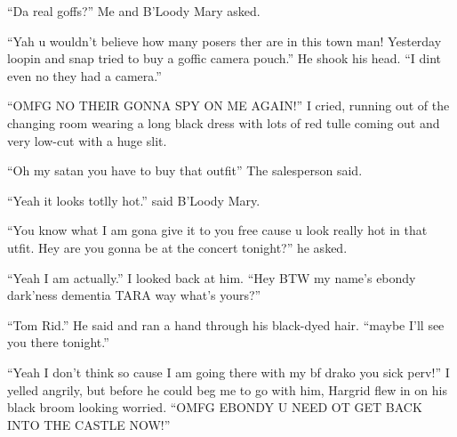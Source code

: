 \enquote{Da real goffs?} Me and B'Loody Mary asked.

\begin{sloppypar}
    \enquote{Yah u wouldn't believe how many posers ther are in this town man! Yesterday loopin and snap tried to buy a goffic camera pouch.} He shook his head. \enquote{I dint even no they had a camera.}
\end{sloppypar}

\enquote{OMFG NO THEIR GONNA SPY ON ME AGAIN\@!} I cried, running out of the changing room wearing a long black dress with lots of red tulle coming out and very low-cut with a huge slit.

\enquote{Oh my satan you have to buy that outfit} The salesperson said.

\enquote{Yeah it looks totlly hot.} said B'Loody Mary.

\enquote{You know what I am gona give it to you free cause u look really hot in that utfit. Hey are you gonna be at the concert tonight?} he asked.

\enquote{Yeah I am actually.} I looked back at him. \enquote{Hey BTW my name's ebondy dark'ness dementia TARA\label{theory:TARA} way what's yours?}

\enquote{Tom Rid.} He said and ran a hand through his black-dyed hair. \enquote{maybe I'll see you there tonight.}

\enquote{Yeah I don't think so cause I am going there with my bf drako you sick perv!} I yelled angrily, but before he could beg me to go with him, Hargrid flew in on his black broom looking worried. \enquote{OMFG EBONDY U NEED OT GET BACK INTO THE CASTLE NOW\@!}

